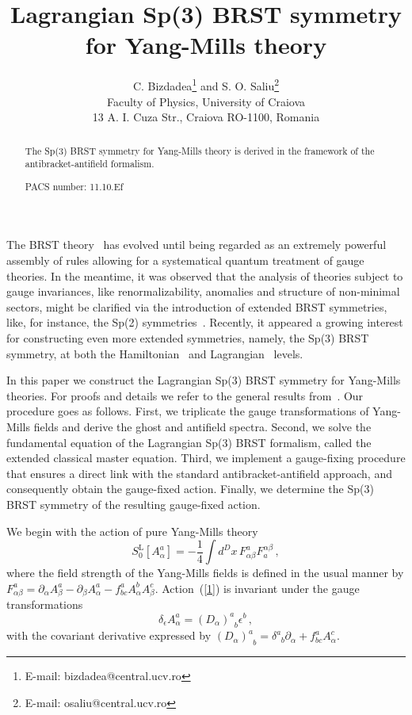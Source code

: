 \documentclass[a4paper,10pt]{article}
\begin{document}
\author{C. Bizdadea\thanks{%
E-mail: bizdadea@central.ucv.ro} and S. O. Saliu\thanks{%
E-mail: osaliu@central.ucv.ro}\\
Faculty of Physics, University of Craiova\\
13 A. I. Cuza Str., Craiova RO-1100, Romania}
\title{Lagrangian Sp(3) BRST symmetry for Yang-Mills theory}

\maketitle

\begin{abstract}
The Sp(3) BRST symmetry for Yang-Mills theory is derived in the framework of
the antibracket-antifield formalism.

PACS number: 11.10.Ef
\end{abstract}

The BRST theory~\cite{1,2,9,8,12} has evolved until being regarded as an
extremely powerful assembly of rules allowing for a systematical quantum
treatment of gauge theories. In the meantime, it was observed that the
analysis of theories subject to gauge invariances, like renormalizability,
anomalies and structure of non-minimal sectors, might be clarified via the
introduction of extended BRST symmetries, like, for instance, the Sp(2)
symmetries~\cite{20,22,29,37}. Recently, it appeared a growing interest for
constructing even more extended symmetries, namely, the Sp(3) BRST symmetry,
at both the Hamiltonian~\cite{38} and Lagrangian~\cite{sp3gen} levels.

In this paper we construct the Lagrangian Sp(3) BRST symmetry for 
Yang-Mills theories. For proofs and details we refer to the
general results from~\cite{sp3gen}. Our procedure goes as follows.
First, we triplicate the gauge transformations of
Yang-Mills fields and derive the ghost and antifield spectra. Second, we
solve the fundamental equation of the Lagrangian Sp(3) BRST formalism,
called the extended classical master equation. Third, we implement a
gauge-fixing procedure that ensures a direct link with the standard
antibracket-antifield approach, and consequently obtain the gauge-fixed
action. Finally, we determine the Sp(3) BRST symmetry of the resulting
gauge-fixed action.

We begin with the action of pure Yang-Mills theory 
\begin{equation}
\label{1}
S_{0}^{\mathrm{L}}\left[ A_{\alpha }^{a}\right] =-\frac{1}{4}\int
d^{D}x\,F_{\alpha \beta }^{a}F_{a}^{\alpha \beta }\,,
\end{equation}
where the field strength of the Yang-Mills fields is defined in the usual
manner by $F_{\alpha \beta }^{a}=\partial _{\alpha }A_{\beta }^{a}-\partial
_{\beta }A_{\alpha }^{a}-f_{bc}^{a}A_{\alpha }^{b}A_{\beta }^{c}$. 
Action~(\ref{1}) is invariant under the gauge transformations 
\begin{equation}
\label{2}
\delta _{\epsilon }A_{\alpha }^{a}=\left( D_{\alpha }\right)
_{\;\;b}^{a}\epsilon ^{b}\,,
\end{equation}
with the covariant derivative expressed by $\left( D_{\alpha }\right)
_{\;\;b}^{a}=\delta _{\;\;b}^{a}\partial _{\alpha }+f_{bc}^{a}A_{\alpha
}^{c} $.
\end{document}
